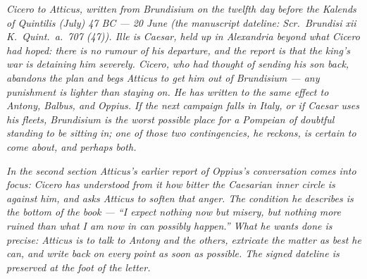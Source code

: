 
\textit{Cicero to Atticus, written from Brundisium on
the twelfth day before the Kalends of Quintilis (July)
47 BC --- 20 June (the manuscript dateline:
\textit{Scr.\ Brundisi xii K.\ Quint.\ a.\ 707 (47)}).
\textit{Ille} is Caesar, held up in Alexandria beyond
what Cicero had hoped: there is no rumour of his
departure, and the report is that the king's war is
detaining him severely. Cicero, who had thought of
sending his son back, abandons the plan and begs
Atticus to get him out of Brundisium --- any punishment
is lighter than staying on. He has written to the same
effect to Antony, Balbus, and Oppius. If the next
campaign falls in Italy, or if Caesar uses his fleets,
Brundisium is the worst possible place for a Pompeian
of doubtful standing to be sitting in; one of those
two contingencies, he reckons, is certain to come
about, and perhaps both.}

\textit{In the second section Atticus's earlier
report of Oppius's conversation comes into focus:
Cicero has understood from it how bitter the Caesarian
inner circle is against him, and asks Atticus to soften
that anger. The condition he describes is the bottom
of the book --- ``I expect nothing now but misery, but
nothing more ruined than what I am now in can possibly
happen.'' What he wants done is precise: Atticus is to
talk to Antony and the others, extricate the matter
as best he can, and write back on every point as soon
as possible. The signed dateline is preserved at the
foot of the letter.}
